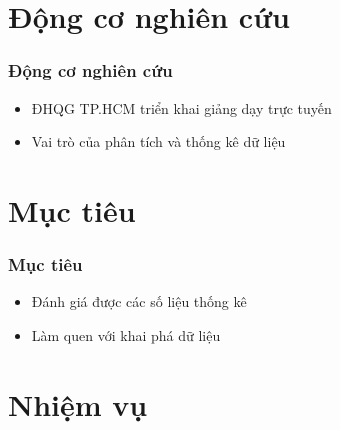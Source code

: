 \documentclass[english,10pt,table]{beamer}
\begin{document}


\frame{ \tableofcontents}

\section{Động cơ nghiên cứu}
\frame
{
\frametitle{Động cơ nghiên cứu}
\begin{itemize}
    \item ĐHQG TP.HCM triển khai giảng dạy trực tuyến
    \item Vai trò của phân tích và thống kê dữ liệu
\end{itemize}
}

\section{Mục tiêu}
\frame
{
\frametitle{Mục tiêu}
\begin{itemize}
    \item Đánh giá được các số liệu thống kê
    \item Làm quen với khai phá dữ liệu
\end{itemize}
}

\section{Nhiệm vụ}
\end{document}
